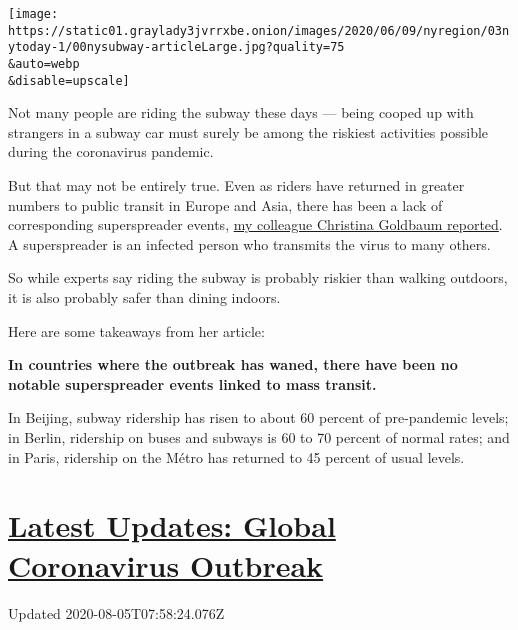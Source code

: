 \texttt{[image: https://static01.graylady3jvrrxbe.onion/images/2020/06/09/nyregion/03nytoday-1/00nysubway-articleLarge.jpg?quality=75\\\&auto=webp\\\&disable=upscale]}

Not many people are riding the subway these days --- being cooped up
with strangers in a subway car must surely be among the riskiest
activities possible during the coronavirus pandemic.

But that may not be entirely true. Even as riders have returned in
greater numbers to public transit in Europe and Asia, there has been a
lack of corresponding superspreader events,
\href{https://www.nytimes3xbfgragh.onion/2020/08/02/nyregion/nyc-subway-coronavirus-safety.html}{my
colleague Christina Goldbaum reported}. A superspreader is an infected
person who transmits the virus to many others.

So while experts say riding the subway is probably riskier than walking
outdoors, it is also probably safer than dining indoors.

Here are some takeaways from her article:

\textbf{In countries where the outbreak has waned, there have been no
notable superspreader events linked to mass transit.}

In Beijing, subway ridership has risen to about 60 percent of
pre-pandemic levels; in Berlin, ridership on buses and subways is 60 to
70 percent of normal rates; and in Paris, ridership on the Métro has
returned to 45 percent of usual levels.

\hypertarget{latest-updates-global-coronavirus-outbreak}{%
\section{\texorpdfstring{\href{https://www.nytimes3xbfgragh.onion/2020/08/04/world/coronavirus-cases.html?action=click\&pgtype=Article\&state=default\&region=MAIN_CONTENT_1\&context=storylines_live_updates}{Latest
Updates: Global Coronavirus
Outbreak}}{Latest Updates: Global Coronavirus Outbreak}}\label{latest-updates-global-coronavirus-outbreak}}

Updated 2020-08-05T07:58:24.076Z

